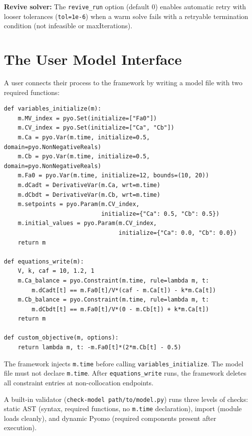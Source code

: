 \documentclass[11pt,letterpaper]{article}
\begin{document}
\textbf{Revive solver:} The \texttt{revive\_run} option (default 0) enables automatic retry with looser tolerances (\texttt{tol=1e-6}) when a warm solve fails with a retryable termination condition (not infeasible or maxIterations).

\section{The User Model Interface}

A user connects their process to the framework by writing a model file with two required functions:

\begin{lstlisting}
def variables_initialize(m):
    m.MV_index = pyo.Set(initialize=["Fa0"])
    m.CV_index = pyo.Set(initialize=["Ca", "Cb"])
    m.Ca = pyo.Var(m.time, initialize=0.5, domain=pyo.NonNegativeReals)
    m.Cb = pyo.Var(m.time, initialize=0.5, domain=pyo.NonNegativeReals)
    m.Fa0 = pyo.Var(m.time, initialize=12, bounds=(10, 20))
    m.dCadt = DerivativeVar(m.Ca, wrt=m.time)
    m.dCbdt = DerivativeVar(m.Cb, wrt=m.time)
    m.setpoints = pyo.Param(m.CV_index,
                            initialize={"Ca": 0.5, "Cb": 0.5})
    m.initial_values = pyo.Param(m.CV_index,
                                 initialize={"Ca": 0.0, "Cb": 0.0})
    return m

def equations_write(m):
    V, k, caf = 10, 1.2, 1
    m.Ca_balance = pyo.Constraint(m.time, rule=lambda m, t:
        m.dCadt[t] == m.Fa0[t]/V*(caf - m.Ca[t]) - k*m.Ca[t])
    m.Cb_balance = pyo.Constraint(m.time, rule=lambda m, t:
        m.dCbdt[t] == m.Fa0[t]/V*(0 - m.Cb[t]) + k*m.Ca[t])
    return m

def custom_objective(m, options):
    return lambda m, t: -m.Fa0[t]*(2*m.Cb[t] - 0.5)
\end{lstlisting}

The framework injects \texttt{m.time} before calling \texttt{variables\_initialize}. The model file must not declare \texttt{m.time}. After \texttt{equations\_write} runs, the framework deletes all constraint entries at non-collocation endpoints.

A built-in validator (\texttt{check-model path/to/model.py}) runs three levels of checks: static AST (syntax, required functions, no \texttt{m.time} declaration), import (module loads cleanly), and dynamic Pyomo (required components present after execution).
\end{document}
